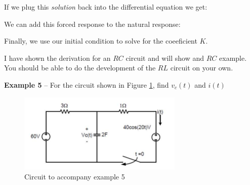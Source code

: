 \documentclass{handout}
\begin{document}
If we plug this {\em solution} back into the differential equation we get:

We can add this forced response to the natural response:
\soln{1in}{
\[
v(t) = Ke^{-\frac{t}{RC}}+\frac{V_A}{1+(\omega RC)^2}\cos (\omega t) +\frac{\omega RCV_A}{1+(\omega RC)^2} \sin (\omega t)
\]
}

Finally, we use our initial condition to solve for the coeeficient $K$.

I have shown the derivation for an $RC$ circuit and will show and $RC$ example.  You should be able to do the development of the $RL$ circuit on your own.

\newpage
\clearpage
\pagebreak

\textbf{Example 5} -- For the circuit shown in Figure \ref{fig: Example5}, find $v_c(t)$ and $i(t)$

\begin{figure} [h!]
\centering
\includegraphics[width=0.7\textwidth]{Example6.jpg}
\caption{Circuit to accompany example 5}
\label{fig: Example5}
\end{figure}
 
\end{document}
